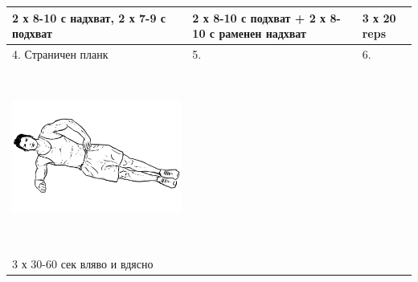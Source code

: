 \documentclass{article}
\begin{document}
\begin{tabular}{ | m{5cm} | m{5cm} | m{5cm} | }
2 х 8-10 с надхват, 2 х 7-9 с подхват & 2 х 8-10 с подхват + 2 х 8-10 с раменен надхват &  3 х 20 reps \\
\hline
4. Страничен планк  & 
5.  & 
6.  \\ 
\begin{minipage}{5cm} \includegraphics[width=\linewidth, height=60mm]{Side-Plank.png} \end{minipage} &
& 
\\ 
3 х 30-60 сек вляво и вдясно &
& 
\\ 
\hline
\end{tabular}
\end{document}

